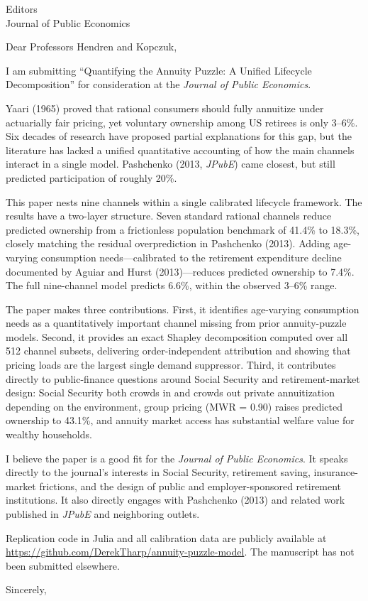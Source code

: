 \documentclass[11pt]{letter}
\begin{document}
\begin{letter}{Editors\\Journal of Public Economics}

\opening{Dear Professors Hendren and Kopczuk,}

I am submitting ``Quantifying the Annuity Puzzle: A Unified Lifecycle Decomposition'' for consideration at the \textit{Journal of Public Economics}.

Yaari (1965) proved that rational consumers should fully annuitize under actuarially fair pricing, yet voluntary ownership among US retirees is only 3--6\%. Six decades of research have proposed partial explanations for this gap, but the literature has lacked a unified quantitative accounting of how the main channels interact in a single model. Pashchenko (2013, \textit{JPubE}) came closest, but still predicted participation of roughly 20\%.

This paper nests nine channels within a single calibrated lifecycle framework. The results have a two-layer structure. Seven standard rational channels reduce predicted ownership from a frictionless population benchmark of 41.4\% to 18.3\%, closely matching the residual overprediction in Pashchenko (2013). Adding age-varying consumption needs---calibrated to the retirement expenditure decline documented by Aguiar and Hurst (2013)---reduces predicted ownership to 7.4\%. The full nine-channel model predicts 6.6\%, within the observed 3--6\% range.

The paper makes three contributions. First, it identifies age-varying consumption needs as a quantitatively important channel missing from prior annuity-puzzle models. Second, it provides an exact Shapley decomposition computed over all 512 channel subsets, delivering order-independent attribution and showing that pricing loads are the largest single demand suppressor. Third, it contributes directly to public-finance questions around Social Security and retirement-market design: Social Security both crowds in and crowds out private annuitization depending on the environment, group pricing (MWR = 0.90) raises predicted ownership to 43.1\%, and annuity market access has substantial welfare value for wealthy households.

I believe the paper is a good fit for the \textit{Journal of Public Economics}. It speaks directly to the journal's interests in Social Security, retirement saving, insurance-market frictions, and the design of public and employer-sponsored retirement institutions. It also directly engages with Pashchenko (2013) and related work published in \textit{JPubE} and neighboring outlets.

Replication code in Julia and all calibration data are publicly available at \url{https://github.com/DerekTharp/annuity-puzzle-model}. The manuscript has not been submitted elsewhere.

\closing{Sincerely,}

\end{letter}
\end{document}
